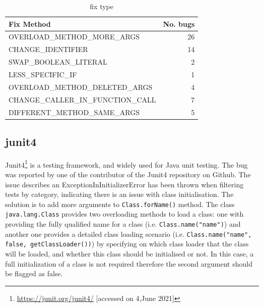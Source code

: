 \documentclass[sigconf,review,anonymous]{acmart}
\begin{document}
\begin{table}[h]
\scriptsize
\caption{fix type}
\footnotesize
\label{tab:results-fixmethod}
\begin{tabular}{|l|r|}
\hline
Fix Method                           & \multicolumn{1}{l|}{No. bugs} \\ \hline
OVERLOAD\_METHOD\_MORE\_ARGS       & 26                          \\ \hline
CHANGE\_IDENTIFIER                 & 14                          \\ \hline
SWAP\_BOOLEAN\_LITERAL             & 2                           \\ \hline
LESS\_SPECIFIC\_IF                 & 1                           \\ \hline
OVERLOAD\_METHOD\_DELETED\_ARGS    & 4                           \\ \hline
CHANGE\_CALLER\_IN\_FUNCTION\_CALL & 7                           \\ \hline
DIFFERENT\_METHOD\_SAME\_ARGS      & 5                           \\ \hline
\end{tabular}
\end{table}


\subsection{junit4}
Junit4\footnote{\url{https://junit.org/junit4/} [accessed on 4,June 2021]} is a testing framework, and widely used for Java unit testing. The bug was reported by one of the contributor of the Junit4 repository on Github. The issue describes an ExceptionInInitializerError has been thrown when filtering tests by category, indicating there is an issue with class initialisation. The solution is to add more arguments to \texttt{Class.forName()} method. The class \texttt{java.lang.Class} \cite{javaclassapi} provides two overloading methods to load a class: one with providing the fully qualified name for a class (i.e. \texttt{Class.name("name")}) and another one provides a detailed class loading scenario (i.e. \texttt{Class.name("name", false, getClassLoader())}) by specifying on which class loader that the class will be loaded, and whether this class should be initialised or not. 
In this case, a full initialization of a class is not required therefore the second argument should be flagged as false. 
\end{document}
